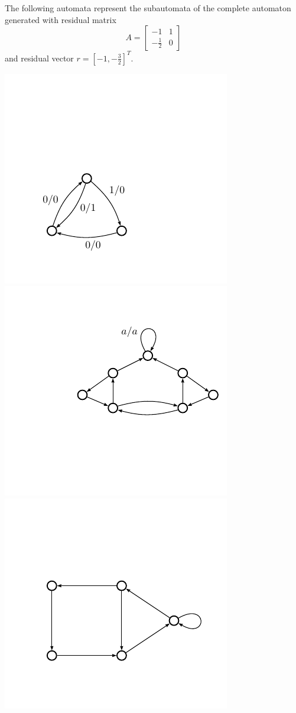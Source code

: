 \documentclass[11pt, titlepage]{article}
\begin{document}
\begin{example}
The following automata represent the subautomata of
the complete automaton generated with residual matrix
\[
  A = \begin{bmatrix}
    -1 &1\\
    -\frac{1}{2} & 0
    \end{bmatrix}
\]
and residual vector $r = [-1, -\frac{3}{2}]^T$.

\vspace{-5em}
\begin{center}
\includegraphics[scale=0.5]{figures/a32}
\includegraphics[scale=0.5]{figures/bowtie}
\includegraphics[scale=0.5]{figures/pent}

\end{center}
\end{example}
\end{document}
